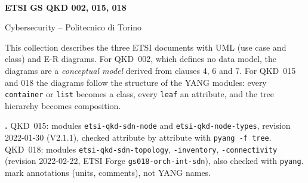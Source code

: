 \newcommand{\diagram}[3]{%
  \begin{figure}[p]
    \centering
    \begingroup\catcode`\_=12
    \begin{adjustbox}{width=\linewidth,max totalheight=.84\textheight,center}
      
    \end{adjustbox}
    \endgroup
    \caption{#2}\label{#3}
  \end{figure}\clearpage}

\begin{titlepage}
\centering
{\Large\bfseries {}\\[2pt]
 ETSI GS QKD 002, 015, 018\par}
\vspace{6pt}
{\small Cybersecurity -- Politecnico di Torino\par}
\vspace{14pt}
\begin{minipage}{.92\linewidth}\small
{}
{This collection describes the three ETSI documents with UML (use case and class) and E-R
diagrams. For QKD~002, which defines no data model, the diagrams are a \emph{conceptual model}
derived from clauses 4, 6 and 7. For QKD~015 and 018 the diagrams follow the structure of the
YANG modules: every \texttt{container} or \texttt{list} becomes a class, every \texttt{leaf} an
attribute, and the tree hierarchy becomes composition.}

\medskip
\textbf{.}
{QKD~015: modules \texttt{etsi-qkd-sdn-node} and \texttt{etsi-qkd-node-types}, revision
2022-01-30 (V2.1.1), checked attribute by attribute with \texttt{pyang -f tree}.
QKD~018: modules \texttt{etsi-qkd-sdn-topology}, \texttt{-inventory}, \texttt{-connectivity} (revision 2022-02-22, ETSI Forge \texttt{gs018-orch-int-sdn}), also checked with \texttt{pyang}.  mark annotations (units, comments), not YANG names.}
\end{minipage}


\end{titlepage}
